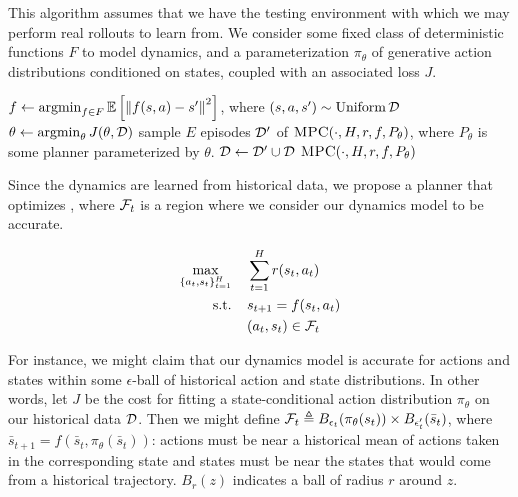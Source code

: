 \documentclass{article}
\begin{document}
\begin{algorithm}
\caption{This algorithm assumes that we have the testing environment with which we may perform real rollouts to learn from. We consider some fixed class of deterministic functions $F$ to model dynamics, and a parameterization $\pi_\theta$ of generative action distributions conditioned on states, coupled with an associated loss $J$.} \label{alg:train}
\begin{algorithmic}[1]
\State $f\gets \operatorname*{argmin}_{f \in F}\operatorname{\mathbb{E}}\left[{\left\lVert f(s,a)-s' \right\rVert^2}\right]$, where $(s,a,s')\sim\operatorname{Uniform}\mathcal{D}$
\State $\theta \gets \operatorname*{argmin}_\theta J(\theta, \mathcal{D})$
\State sample $E$ episodes $\mathcal{D}'$ of $\textsc{MPC}(\cdot,  H, r, f, P_\theta)$, where $P_\theta$ is some planner parameterized by $\theta$.
\State $\mathcal{D}\gets\mathcal{D}'\cup\mathcal{D}$
\EndFor
\State \Return $\textsc{MPC}(\cdot,  H, r, f, P_\theta)$
\EndProcedure
\end{algorithmic}
\end{algorithm}

Since the dynamics are learned from historical data, we propose a planner that optimizes , where $\mathcal{F}_t$ is a region where we consider our dynamics model to be accurate.

\begin{align}
    \max_{\{a_t,s_t\}_{t=1}^H}&\;\;\;\; \sum_{t=1}^H r(s_t, a_t) \label{eq:constrained}\\
  \text{s.t.} &\;\;\;\; s_{t+1} = f(s_t,a_t)\nonumber\\
      & \;\;\;\;(a_t,s_t)\in \mathcal{F}_t \nonumber
\end{align}

For instance, we might claim that our dynamics model is accurate for actions and states within some $\epsilon$-ball of historical action and state distributions. In other words, let $J$ be the cost for fitting a state-conditional action distribution $\pi_\theta$ on our historical data $\mathcal{D}$. Then we might define $\mathcal{F}_t\triangleq B_{\epsilon_t}(\pi_\theta(s_t))\times B_{\epsilon_t'}(\bar s_t)$, where $\bar s_{t+1}=f(\bar s_t, \pi_\theta (\bar s_t))$: actions must be near a historical mean of actions taken in the corresponding state and states must be near the states that would come from a historical trajectory. $B_r(z)$ indicates a ball of radius $r$ around $z$.
\end{document}

